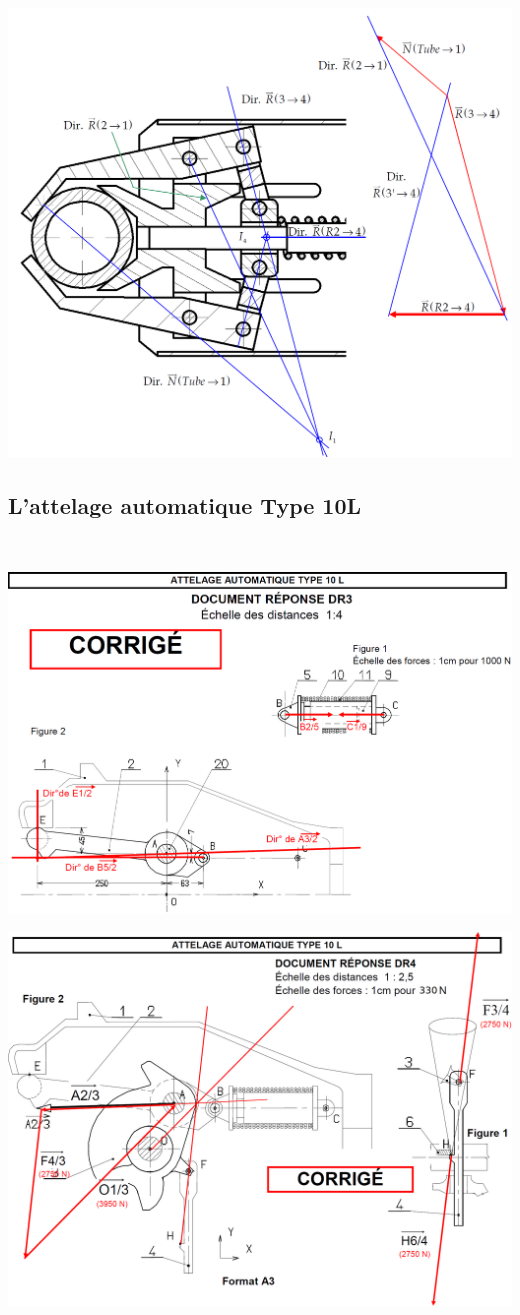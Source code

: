 \begin{center}
 \includegraphics[width=0.9\linewidth]{img/climb2_cor}
\end{center}

\newpage

\subsection{L'attelage automatique Type 10L}

~\

\begin{center}
 \includegraphics[width=0.9\linewidth]{img/tgv1_cor}
\end{center}
 
\begin{center}
 \includegraphics[width=0.9\linewidth]{img/tgv2_cor}
\end{center}

